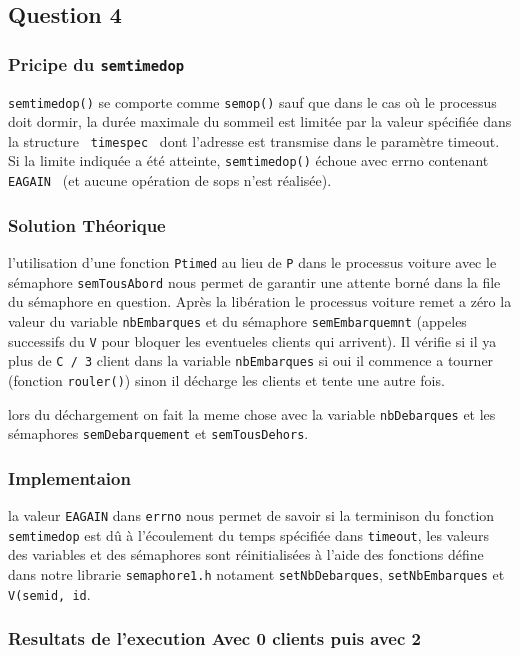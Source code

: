 \subsection{Question 4}
\subsubsection{Pricipe du \texttt{semtimedop}}
\texttt{semtimedop()} se comporte comme \texttt{semop()} sauf que dans le cas
où le processus doit dormir, la durée maximale du sommeil est limitée par la
valeur spécifiée dans la structure \texttt{ timespec } dont l'adresse est
transmise dans le paramètre timeout. Si la limite indiquée a été atteinte,
\texttt{semtimedop()} échoue avec errno contenant \texttt{ EAGAIN } (et aucune
opération de sops n'est réalisée).

\subsubsection{Solution Théorique}
l'utilisation d'une fonction \texttt{Ptimed} au lieu de \texttt{P} dans le processus
voiture avec le sémaphore \texttt{semTousAbord} nous
permet de garantir une attente borné dans la file du sémaphore en question.
Après la libération le processus voiture remet a zéro la valeur du variable
\texttt{nbEmbarques} et du sémaphore \texttt{semEmbarquemnt} (appeles successifs du
\texttt{V} pour bloquer les eventueles clients qui arrivent). Il vérifie si il
ya plus de \texttt{C / 3} client dans la variable \texttt{nbEmbarques} si oui il
commence a tourner (fonction \texttt{rouler()}) sinon il décharge les clients et
tente une autre fois.

lors du déchargement on fait la meme chose avec la variable
\texttt{nbDebarques} et les sémaphores \texttt{semDebarquement} et \texttt{semTousDehors}.

\subsubsection{Implementaion}
la valeur \texttt{EAGAIN} dans \texttt{errno} nous permet de savoir si la
terminison du fonction \texttt{semtimedop} est dû à l'écoulement du temps
spécifiée dans \texttt{timeout}, les valeurs des variables et des sémaphores
sont réinitialisées à l'aide des fonctions défine dans notre librarie
\texttt{semaphore1.h} notament \texttt{setNbDebarques}, \texttt{setNbEmbarques} et
\texttt{V(semid, id}.

\subsubsection{Resultats de l'execution Avec 0 clients puis avec 2}




